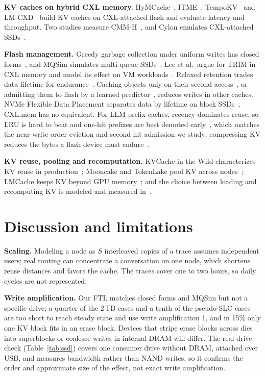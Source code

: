\documentclass[acmsmall,screen,review]{acmart}
\begin{document}
\textbf{KV caches on hybrid CXL memory.} HyMCache~\cite{hymcache}, ITME~\cite{itme},
TempoKV~\cite{tempokv} and LM-CXD~\cite{lmcxd} build KV caches on CXL-attached flash and evaluate
latency and throughput. Two studies measure CMM-H~\cite{cmmh,cmmh_hs}, and Cylon emulates CXL-attached
SSDs~\cite{cylon}.

\textbf{Flash management.} Greedy garbage collection under uniform writes has closed
forms~\cite{desnoyers,vanhoudt}, and MQSim simulates multi-queue SSDs~\cite{mqsim}. Lee et al.\
argue for TRIM in CXL memory and model its effect on VM workloads~\cite{trimcxl}. Relaxed retention
trades data lifetime for endurance~\cite{warm}. Caching objects only on their second
access~\cite{secondhit}, or admitting them to flash by a learned
predictor~\cite{flashield,baleen}, reduces writes in other caches. NVMe Flexible Data Placement
separates data by lifetime on block SSDs~\cite{fdp_cachelib,fdp_promise}; CXL.mem has no
equivalent. For LLM prefix caches, recency dominates reuse, so LRU is hard to beat and one-hit
prefixes are best demoted early~\cite{fancy_eviction}, which matches the near-write-order eviction
and second-hit admission we study; compressing KV reduces the bytes a flash device must
endure~\cite{flash_inference}.

\textbf{KV reuse, pooling and recomputation.} KVCache-in-the-Wild characterizes KV reuse in
production~\cite{kvwild}; Mooncake and TokenLake pool KV across nodes~\cite{mooncake,tokenlake};
LMCache keeps KV beyond GPU memory~\cite{lmcache}; and the choice between loading and recomputing KV
is modeled and measured in~\cite{restore_recompute,pykvcache}.

\section{Discussion and limitations}
\label{sec:disc}
\textbf{Scaling.} Modeling a node as $S$ interleaved copies of a trace assumes independent users;
real routing can concentrate a conversation on one node, which shortens reuse distances and favors
the cache. The traces cover one to two hours, so daily cycles are not represented.

\textbf{Write amplification.} Our FTL matches closed forms and MQSim but not a specific drive; a
quarter of the 2\,TB cases and a tenth of the pseudo-SLC cases are too short to reach steady state
and use write amplification 1, and in 15\% only one KV block fits in an erase block. Devices that
stripe erase blocks across dies into superblocks or coalesce writes in internal DRAM will differ. The
real-drive check (Table~\ref{tab:ssd}) covers one consumer drive without DRAM, attached over USB, and
measures bandwidth rather than NAND writes, so it confirms the order and approximate size of the
effect, not exact write amplification.
\end{document}
